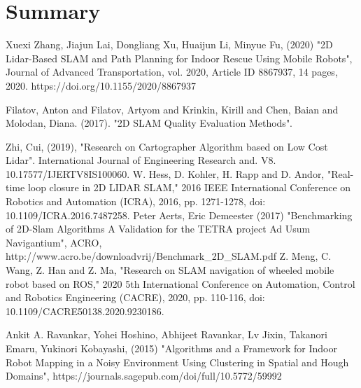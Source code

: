 \documentclass[12pt, a4paper, onecolumn]{article}
\begin{document}
\section{Summary}
\newpage
\begin{thebibliography}{9}
Xuexi Zhang, Jiajun Lai, Dongliang Xu, Huaijun Li, Minyue Fu, (2020) "2D Lidar-Based SLAM and Path Planning for Indoor Rescue Using Mobile Robots", Journal of Advanced Transportation, vol. 2020, Article ID 8867937, 14 pages, 2020. https://doi.org/10.1155/2020/8867937

Filatov, Anton and Filatov, Artyom and Krinkin, Kirill and Chen, Baian and Molodan, Diana. (2017). "2D SLAM Quality Evaluation Methods". 

Zhi, Cui, (2019), "Research on Cartographer Algorithm based on Low Cost Lidar". International Journal of Engineering Research and. V8. 10.17577/IJERTV8IS100060. 
W. Hess, D. Kohler, H. Rapp and D. Andor, "Real-time loop closure in 2D LIDAR SLAM," 2016 IEEE International Conference on Robotics and Automation (ICRA), 2016, pp. 1271-1278, doi: 10.1109/ICRA.2016.7487258.
Peter Aerts, Eric Demeester (2017) "Benchmarking of 2D-Slam Algorithms
A Validation for the TETRA project Ad Usum Navigantium", ACRO, http://www.acro.be/downloadvrij/Benchmark{\_}2D{\_}SLAM.pdf
Z. Meng, C. Wang, Z. Han and Z. Ma, "Research on SLAM navigation of wheeled mobile robot based on ROS," 2020 5th International Conference on Automation, Control and Robotics Engineering (CACRE), 2020, pp. 110-116, doi: 10.1109/CACRE50138.2020.9230186.


  Ankit A. Ravankar, Yohei Hoshino, Abhijeet Ravankar, Lv Jixin, Takanori Emaru, Yukinori Kobayashi, (2015) "Algorithms and a Framework for Indoor Robot Mapping in a Noisy Environment Using Clustering in Spatial and Hough Domains", https://journals.sagepub.com/doi/full/10.5772/59992
\end{thebibliography}
\end{document}
